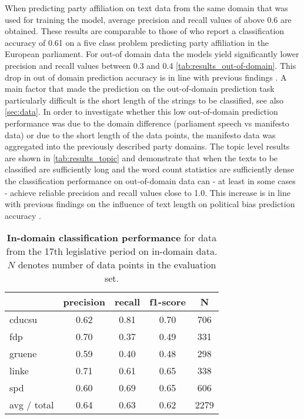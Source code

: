\documentclass[11pt]{article}
\begin{document}
When predicting party affiliation on text data from the same domain that was used for training the model, average precision and recall values of above 0.6 are obtained. These results are comparable to those of \cite{Hirst2014} who report a classification accuracy of 0.61 on a five class problem predicting party affiliation in the European parliament.
For out-of domain data the models yield significantly lower precision and recall values between 0.3 and 0.4 \autoref{tab:results_out-of-domain}. This drop in out of domain prediction accuracy is in line with previous findings \cite{Yu2008}.
A main factor that made the prediction on the out-of-domain prediction task particularly difficult is the short length of the strings to be classified, see also \autoref{sec:data}. In order to investigate whether this low out-of-domain prediction performance was due to the domain difference (parliament speech vs manifesto data) or due to the short length of the data points, the manifesto data was aggregated into the previously described party domains. The topic level results are shown in \autoref{tab:results_topic} and demonstrate that when the texts to be classified are sufficiently long and the word count statistics are sufficiently dense the classification performance on out-of-domain data can - at least in some cases - achieve reliable precision and recall values close to 1.0. This increase is in line with previous findings on the influence of text length on political bias prediction accuracy \cite{Hirst2014}.


\begin{table}[t]
\caption{
\label{tab:results_in-domain}
{\bf In-domain classification performance} for data from the 17th legislative period on in-domain data. $N$ denotes number of data points in the evaluation set.
}
\begin{center}
\begin{tabular}{lcccc}
    &         precision    &recall &  f1-score  & N  \\
\hline \hline
       cducsu   &    0.62  &    0.81  &    0.70  &     706\\
        fdp    &   0.70   &   0.37  &    0.49    &   331\\
     gruene &      0.59  &    0.40   &   0.48   &    298\\
      linke    &   0.71   &   0.61  &    0.65    &   338\\
        spd   &    0.60   &   0.69  &    0.65   &    606\\
\hline
avg / total &      0.64   &   0.63   &   0.62    &  2279 
%
\end{tabular}
\end{center}
\end{table}
\end{document}
